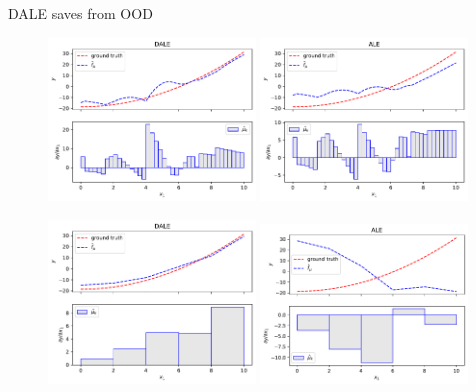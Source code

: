 \documentclass[final]{beamer}
\newlength{\colwidth}
\begin{document}
\begin{frame}[t]
\begin{columns}[t]
\begin{column}{\colwidth}
\begin{block}{DALE saves from OOD}
        \begin{figure}
          \centering
          \includegraphics[width=0.49\textwidth]{./../ACML-presentation/figures/dale_40_bins.pdf}
          \includegraphics[width=0.49\textwidth]{./../ACML-presentation/figures/ale_40_bins.pdf}
        \end{figure}
        
        \begin{figure}
          \centering
          \includegraphics[width=0.49\textwidth]{./../ACML-presentation/figures/dale_5_bins.pdf}
          \includegraphics[width=0.49\textwidth]{./../ACML-presentation/figures/ale_5_bins.pdf}
        \end{figure}
			\end{block}
			

\end{column}
\end{columns}
\end{frame}
\end{document}
